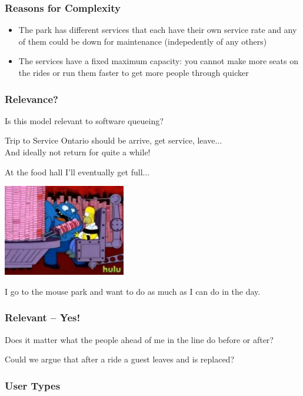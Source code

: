 \begin{frame}
\frametitle{Reasons for Complexity}

\begin{itemize}
	\item The park has different services that each have their own service rate and any of them could be down for maintenance (indepedently of any others) \vspace{5em}
	\item The services have a fixed maximum capacity: you cannot make more seats on the rides or run them faster to get more people through quicker
\end{itemize}


\end{frame}


\begin{frame}
\frametitle{Relevance?}

Is this model relevant to software queueing?

Trip to Service Ontario should be arrive, get service, leave...\\
\quad And ideally not return for quite a while!

At the food hall I'll eventually get full...

\begin{center}
	\includegraphics[width=0.4\textwidth]{images/donuthell.jpg}
\end{center}

I go to the mouse park and want to do as much as I can do in the day.

\end{frame}


\begin{frame}
\frametitle{Relevant -- Yes!}

Does it matter what the people ahead of me in the line do before or after?

Could we argue that after a ride a guest leaves and is replaced?

\end{frame}


\begin{frame}
\frametitle{User Types}


\end{frame}






